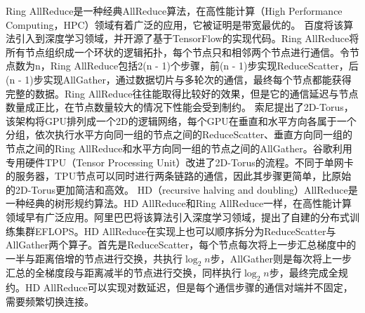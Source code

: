 Ring AllReduce是一种经典AllReduce算法，在高性能计算（High Performance Computing，HPC）领域有着广泛的应用，它被证明是带宽最优的\cite{patarasuk2009bandwidth}。 百度将该算法引入到深度学习领域，并开源了基于TensorFlow的实现代码\cite{gibiansky2017hpc}。Ring AllReduce将所有节点组织成一个环状的逻辑拓扑，每个节点只和相邻两个节点进行通信。令节点数为n，Ring AllReduce包括2(n - 1)个步骤，前(n - 1)步实现ReduceScatter，后(n - 1)步实现AllGather，通过数据切片与多轮次的通信，最终每个节点都能获得完整的数据。Ring AllReduce往往能取得比较好的效果，但是它的通信延迟与节点数量成正比，在节点数量较大的情况下性能会受到制约。
索尼提出了2D-Torus\cite{mikami2018massively}，该架构将GPU排列成一个2D的逻辑网络，每个GPU在垂直和水平方向各属于一个分组，依次执行水平方向同一组的节点之间的ReduceScatter、垂直方向同一组的节点之间的Ring AllReduce和水平方向同一组的节点之间的AllGather。谷歌利用专用硬件TPU（Tensor Processing Unit）改进了2D-Torus的流程\cite{ying2018image}。不同于单网卡的服务器，TPU节点可以同时进行两条链路的通信，因此其步骤更简单，比原始的2D-Torus更加简洁和高效。
HD（recursive halving and doubling）AllReduce是一种经典的树形规约算法。HD AllReduce和Ring AllReduce一样，在高性能计算领域早有广泛应用\cite{thakur2005optimization}。阿里巴巴将该算法引入深度学习领域，提出了自建的分布式训练集群EFLOPS\cite{dong2020eflops}。HD AllReduce在实现上也可以顺序拆分为ReduceScatter与AllGather两个算子。首先是ReduceScatter，每个节点每次将上一步汇总梯度中的一半与距离倍增的节点进行交换，共执行$\log_2n$步，AllGather则是每次将上一步汇总的全梯度段与距离减半的节点进行交换，同样执行$\log_2n$步，最终完成全规约。HD AllReduce可以实现对数延迟，但是每个通信步骤的通信对端并不固定，需要频繁切换连接。
